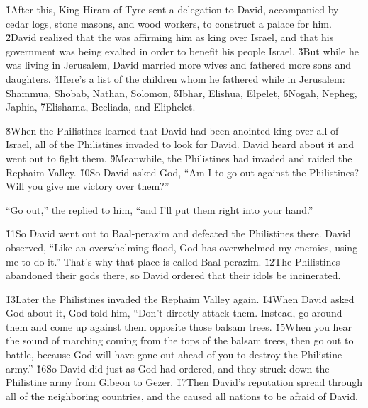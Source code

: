 \v{1}After this, King Hiram of Tyre sent a delegation to David, accompanied by cedar logs, stone masons, and wood workers, to construct a palace for him. \v{2}David realized that the  was affirming him as king over Israel, and that his government was being exalted in order to benefit his people Israel. \v{3}But while he was living in Jerusalem, David married more wives and fathered more sons and daughters. \v{4}Here's a list of the children whom he fathered while in Jerusalem: Shammua, Shobab, Nathan, Solomon, \v{5}Ibhar, Elishua, Elpelet, \v{6}Nogah, Nepheg, Japhia, \v{7}Elishama, Beeliada, and Eliphelet.

\v{8}When the Philistines learned that David had been anointed king over all of Israel, all of the Philistines invaded to look for David. David heard about it and went out to fight them. \v{9}Meanwhile, the Philistines had invaded and raided the Rephaim Valley. \v{10}So David asked God, ``Am I to go out against the Philistines? Will you give me victory over them?''

``Go out,'' the  replied to him, ``and I'll put them right into your hand.''

\v{11}So David went out to Baal-perazim and defeated the Philistines there. David observed, ``Like an overwhelming flood, God has overwhelmed my enemies, using me to do it.'' That's why that place is called Baal-perazim. \v{12}The Philistines abandoned their gods there, so David ordered that their idols be incinerated.

\v{13}Later the Philistines invaded the Rephaim Valley again. \v{14}When David asked God about it, God told him, ``Don't directly attack them. Instead, go around them and come up against them opposite those balsam trees. \v{15}When you hear the sound of marching coming from the tops of the balsam trees, then go out to battle, because God will have gone out ahead of you to destroy the Philistine army.'' \v{16}So David did just as God had ordered, and they struck down the Philistine army from Gibeon to Gezer. \v{17}Then David's reputation spread through all of the neighboring countries, and the  caused all nations to be afraid of David.

